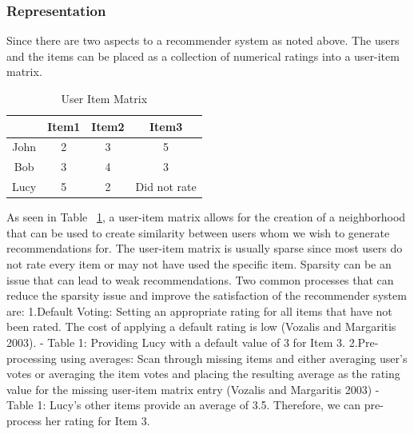 \subsubsection{Representation}
Since there are two aspects to a recommender system as noted above. The users and the items can be placed as a collection of numerical ratings into a user-item matrix.\\
\begin{table}[ht]
\caption{User Item Matrix} %
\centering  %
\begin{tabular}{c c c c} %
\hline\hline                        %
 & Item1 & Item2& Item3 \\ [0.5ex] %
\hline                  %

John & 2 & 3  & 5  \\
Bob & 3 & 4 & 3 \\
Lucy & 5 & 2& Did not rate \\[1ex]      %
\hline %
\end{tabular}
\label{table:3} %
\end{table}

As seen in Table ~\ref{table:3}, a user-item matrix allows for the creation of a neighborhood that can be used to create similarity between users whom we wish to generate recommendations for. The user-item matrix is usually sparse since most users do not rate every item or may not have used the specific item.
Sparsity can be an issue that can lead to weak recommendations. Two common processes that can reduce the sparsity issue and improve the satisfaction of the recommender system are:
1.Default Voting: Setting an appropriate rating for all items that have not been rated. The cost of applying a default rating is low (Vozalis and Margaritis 2003).   - Table 1: Providing Lucy with a default value of 3 for Item 3.
2.Pre-processing using averages: Scan through missing items and either averaging user’s votes or averaging the item votes and placing the resulting average as the rating value for the missing user-item matrix entry (Vozalis and Margaritis 2003)    - Table 1: Lucy’s other items provide an average of 3.5. Therefore, we can pre-process her rating for Item 3.

